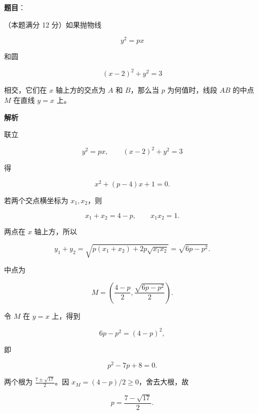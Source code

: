\begin{answer}

\textbf{题目}：

（本题满分 12 分）如果抛物线

\nopagebreak[4]
\[
y^2=px
\]

和圆

\nopagebreak[4]
\[
(x-2)^2+y^2=3
\]

相交，它们在 $x$ 轴上方的交点为 $A$ 和 $B$，那么当 $p$ 为何值时，线段 $AB$ 的中点 $M$ 在直线 $y=x$ 上。
\nopagebreak[4]
\begin{center}\end{center}
\nopagebreak[4]
\textbf{解析}

联立

\nopagebreak[4]
\[
y^2=px,\qquad (x-2)^2+y^2=3
\]

得

\nopagebreak[4]
\[
x^2+(p-4)x+1=0.
\]

若两个交点横坐标为 $x_1,x_2$，则

\nopagebreak[4]
\[
x_1+x_2=4-p,\qquad x_1x_2=1.
\]

两点在 $x$ 轴上方，所以

\nopagebreak[4]
\[
y_1+y_2
=\sqrt{p(x_1+x_2)+2p\sqrt{x_1x_2}}
=\sqrt{6p-p^2}.
\]

中点为

\nopagebreak[4]
\[
M=\left(\frac{4-p}{2},\frac{\sqrt{6p-p^2}}2\right).
\]

令 $M$ 在 $y=x$ 上，得到

\nopagebreak[4]
\[
6p-p^2=(4-p)^2,
\]

即

\nopagebreak[4]
\[
p^2-7p+8=0.
\]

两个根为 $\frac{7\pm\sqrt{17}}2$。因 $x_M=(4-p)/2\ge0$，舍去大根，故

\nopagebreak[4]
\[
p=\frac{7-\sqrt{17}}2.
\]


\end{answer}
